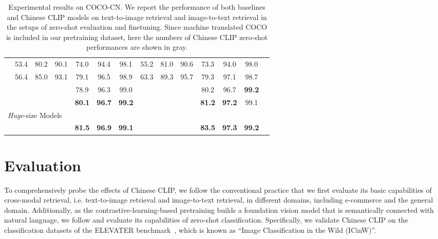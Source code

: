 \documentclass[11pt]{article}
\begin{document}
\begin{table*}[t]
\begin{adjustbox}{max width=1.\textwidth}
\begin{tabular}{@{\extracolsep{\fill}}lccccccccccccc}
    & 53.4	& 80.2	& 90.1	& 74.0	& 94.4	& 98.1	& 55.2	& 81.0	& 90.6	& 73.3	& 94.0	& 98.0
    \\
    
    & 56.4	& 85.0	& 93.1	& 79.1	& 96.5	& 98.9	& 63.3	& 89.3	& 95.7	& 79.3	& 97.1	& 98.7
    \\
    
     & \color{gray}{64.0}	  & \color{gray}{89.2}	 & \color{gray}{94.4}	 & 78.9	 & 96.3	 & 99.0	 & \color{gray}{60.4}	 & \color{gray}{84.2}	 & \color{gray}{92.9}	 & 80.2	 & 96.7	 & \textbf{99.2}
    \\
    
    & \color{gray}{64.7}	& \color{gray}{89.6}	& \color{gray}{94.6}	& \textbf{80.1}	& \textbf{96.7}	& \textbf{99.2} & \color{gray}{63.4}	& \color{gray}{87.2}	& \color{gray}{94.4}	& \textbf{81.2}	& \textbf{97.2}	& 99.1
    \\
\midrule
    \multicolumn{9}{l}{\textit{Huge}-size Models} \\
    
    & \color{gray}{69.2}	& \color{gray}{89.9}	& \color{gray}{96.1}	& \textbf{81.5}	& \textbf{96.9}	& \textbf{99.1}	& \color{gray}{63.0}	& \color{gray}{86.6}	& \color{gray}{92.9}	& \textbf{83.5}	& \textbf{97.3}	& \textbf{99.2}
    \\    
\bottomrule
\end{tabular}
\end{adjustbox}
\caption{Experimental results on COCO-CN. We report the performance of both baselines and Chinese CLIP models on text-to-image retrieval and image-to-text retrieval in the setups of zero-shot evaluation and finetuning. Since machine translated COCO is included in our pretraining dataset, here the numbers of Chinese CLIP zero-shot performances are shown in gray.}
\label{tb:coco}
\end{table*} 
\section{Evaluation}
To comprehensively probe the effects of Chinese CLIP, we follow the conventional practice that we first evaluate its basic capabilities of cross-modal retrieval, i.e. text-to-image retrieval and image-to-text retrieval, in different domains, including e-commerce and the general domain. 
Additionally, as the contrastive-learning-based pretraining builds a foundation vision model that is semantically connected with natural language, we follow \citet{clip} and evaluate its capabilities of zero-shot classification. Specifically, we validate Chinese CLIP on the classification datasets of the ELEVATER benchmark~\citep{elevater}, which is known as ``Image Classification in the Wild (ICinW)''. 
\end{document}
